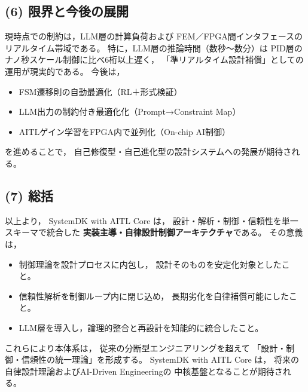 \subsection{(6) 限界と今後の展開}
現時点での制約は，LLM層の計算負荷および
FEM／FPGA間インタフェースのリアルタイム帯域である。
特に，LLM層の推論時間（数秒～数分）は
PID層のナノ秒スケール制御に比べ6桁以上遅く，
「準リアルタイム設計補償」としての運用が現実的である。
今後は，
\begin{itemize}
  \item FSM遷移則の自動最適化（RL＋形式検証）
  \item LLM出力の制約付き最適化化（Prompt→Constraint Map）
  \item AITLゲイン学習をFPGA内で並列化（On-chip AI制御）
\end{itemize}
を進めることで，
自己修復型・自己進化型の設計システムへの発展が期待される。

\subsection{(7) 総括}
以上より，
SystemDK with AITL Core は，
設計・解析・制御・信頼性を単一スキーマで統合した
\textbf{実装主導・自律設計制御アーキテクチャ}である。
その意義は，
\begin{itemize}
  \item 制御理論を設計プロセスに内包し，
        設計そのものを安定化対象としたこと。
  \item 信頼性解析を制御ループ内に閉じ込め，
        長期劣化を自律補償可能にしたこと。
  \item LLM層を導入し，論理的整合と再設計を知能的に統合したこと。
\end{itemize}
これらにより本体系は，
従来の分断型エンジニアリングを超えて
「設計・制御・信頼性の統一理論」を形成する。
SystemDK with AITL Core は，
将来の自律設計理論およびAI-Driven Engineeringの
中核基盤となることが期待される。
